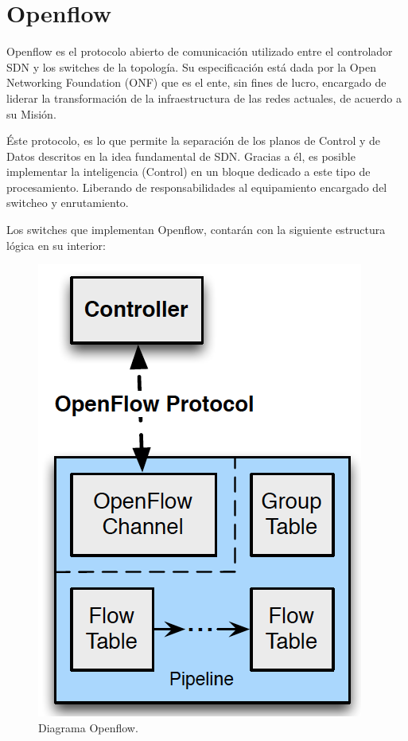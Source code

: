 \documentclass[12pt,a4paper,oneside]{book}
\begin{document}
\section{Openflow}
\label{marco_openflow}

Openflow es el protocolo abierto de comunicación utilizado entre el controlador SDN y los switches de la topología. Su especificación está dada por la Open Networking Foundation (ONF) que es el ente, sin fines de lucro, encargado de liderar la transformación de la infraestructura de las redes actuales, de acuerdo a su Misión.

\vspace{0.5cm}

Éste protocolo, es lo que permite la separación de los planos de Control y de Datos descritos en la idea fundamental de SDN. Gracias a él, es posible implementar la inteligencia (Control) en un bloque dedicado a este tipo de procesamiento. Liberando de responsabilidades al equipamiento encargado del switcheo y enrutamiento.

\vspace{0.5cm}

Los switches que implementan Openflow, contarán con la siguiente estructura lógica en su interior:

\begin{figure}[ht]
 \centering
 \includegraphics[scale=0.5]{fotos/2_MarcoTeorico/openflow_diagram.png}
 \caption{Diagrama Openflow.}
 \label{openflowdiagram}
\end{figure}
\end{document}
